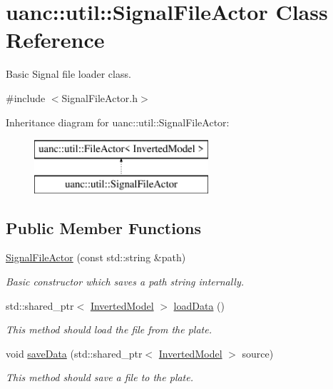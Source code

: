 \hypertarget{classuanc_1_1util_1_1_signal_file_actor}{}\section{uanc\+:\+:util\+:\+:Signal\+File\+Actor Class Reference}
\label{classuanc_1_1util_1_1_signal_file_actor}


Basic Signal file loader class.  




{\ttfamily \#include $<$Signal\+File\+Actor.\+h$>$}

Inheritance diagram for uanc\+:\+:util\+:\+:Signal\+File\+Actor\+:\begin{figure}[H]
\begin{center}
\leavevmode
\includegraphics[height=2.000000cm]{classuanc_1_1util_1_1_signal_file_actor}
\end{center}
\end{figure}
\subsection*{Public Member Functions}
\begin{DoxyCompactItemize}
\item 
\hyperlink{classuanc_1_1util_1_1_signal_file_actor_a0c4e494e7e700d4e0130b56e4dc82b8f}{Signal\+File\+Actor} (const std\+::string \&path)
\begin{DoxyCompactList}\small\item\em Basic constructor which saves a path string internally. \end{DoxyCompactList}\item 
std\+::shared\+\_\+ptr$<$ \hyperlink{classuanc_1_1amv_1_1_inverted_model}{Inverted\+Model} $>$ \hyperlink{classuanc_1_1util_1_1_signal_file_actor_a2069e33e03ebc63eac2080d40f863ce3}{load\+Data} ()
\begin{DoxyCompactList}\small\item\em This method should load the file from the plate. \end{DoxyCompactList}\item 
void \hyperlink{classuanc_1_1util_1_1_signal_file_actor_a77695bd57923ec24ff78ec8361bcfca2}{save\+Data} (std\+::shared\+\_\+ptr$<$ \hyperlink{classuanc_1_1amv_1_1_inverted_model}{Inverted\+Model} $>$ source)
\begin{DoxyCompactList}\small\item\em This method should save a file to the plate. \end{DoxyCompactList}\end{DoxyCompactItemize}


